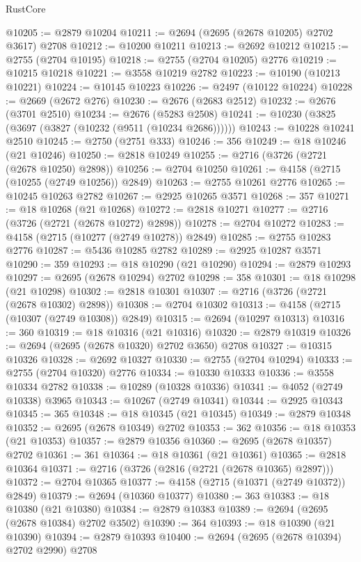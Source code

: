 \begin{lexlean}{RustCore}
\begin{coremodule}
@10205 := @2879 @10204
@10211 := @2694 (@2695 (@2678 @10205) @2702 @3617) @2708
@10212 := @10200 @10211
@10213 := @2692 @10212
@10215 := @2755 (@2704 @10195)
@10218 := @2755 (@2704 @10205) @2776
@10219 := @10215 @10218
@10221 := @3558 @10219 @2782
@10223 := @10190 (@10213 @10221)
@10224 := @10145 @10223
@10226 := @2497 (@10122 @10224)
@10228 := @2669 (@2672 @276)
@10230 := @2676 (@2683 @2512)
@10232 := @2676 (@3701 @2510)
@10234 := @2676 (@5283 @2508)
@10241 := @10230 (@3825 (@3697 (@3827 (@10232 (@9511 (@10234 @2686))))))
@10243 := @10228 @10241 @2510
@10245 := @2750 (@2751 @333)
@10246 := 356
@10249 := @18 @10246 (@21 @10246)
@10250 := @2818 @10249
@10255 := @2716 (@3726 (@2721 (@2678 @10250) @2898))
@10256 := @2704 @10250
@10261 := @4158 (@2715 (@10255 (@2749 @10256)) @2849)
@10263 := @2755 @10261 @2776
@10265 := @10245 @10263 @2782
@10267 := @2925 @10265 @3571
@10268 := 357
@10271 := @18 @10268 (@21 @10268)
@10272 := @2818 @10271
@10277 := @2716 (@3726 (@2721 (@2678 @10272) @2898))
@10278 := @2704 @10272
@10283 := @4158 (@2715 (@10277 (@2749 @10278)) @2849)
@10285 := @2755 @10283 @2776
@10287 := @5436 @10285 @2782
@10289 := @2925 @10287 @3571
@10290 := 359
@10293 := @18 @10290 (@21 @10290)
@10294 := @2879 @10293
@10297 := @2695 (@2678 @10294) @2702
@10298 := 358
@10301 := @18 @10298 (@21 @10298)
@10302 := @2818 @10301
@10307 := @2716 (@3726 (@2721 (@2678 @10302) @2898))
@10308 := @2704 @10302
@10313 := @4158 (@2715 (@10307 (@2749 @10308)) @2849)
@10315 := @2694 (@10297 @10313)
@10316 := 360
@10319 := @18 @10316 (@21 @10316)
@10320 := @2879 @10319
@10326 := @2694 (@2695 (@2678 @10320) @2702 @3650) @2708
@10327 := @10315 @10326
@10328 := @2692 @10327
@10330 := @2755 (@2704 @10294)
@10333 := @2755 (@2704 @10320) @2776
@10334 := @10330 @10333
@10336 := @3558 @10334 @2782
@10338 := @10289 (@10328 @10336)
@10341 := @4052 (@2749 @10338) @3965
@10343 := @10267 (@2749 @10341)
@10344 := @2925 @10343
@10345 := 365
@10348 := @18 @10345 (@21 @10345)
@10349 := @2879 @10348
@10352 := @2695 (@2678 @10349) @2702
@10353 := 362
@10356 := @18 @10353 (@21 @10353)
@10357 := @2879 @10356
@10360 := @2695 (@2678 @10357) @2702
@10361 := 361
@10364 := @18 @10361 (@21 @10361)
@10365 := @2818 @10364
@10371 := @2716 (@3726 (@2816 (@2721 (@2678 @10365) @2897)))
@10372 := @2704 @10365
@10377 := @4158 (@2715 (@10371 (@2749 @10372)) @2849)
@10379 := @2694 (@10360 @10377)
@10380 := 363
@10383 := @18 @10380 (@21 @10380)
@10384 := @2879 @10383
@10389 := @2694 (@2695 (@2678 @10384) @2702 @3502)
@10390 := 364
@10393 := @18 @10390 (@21 @10390)
@10394 := @2879 @10393
@10400 := @2694 (@2695 (@2678 @10394) @2702 @2990) @2708

\end{coremodule}
\end{lexlean}
